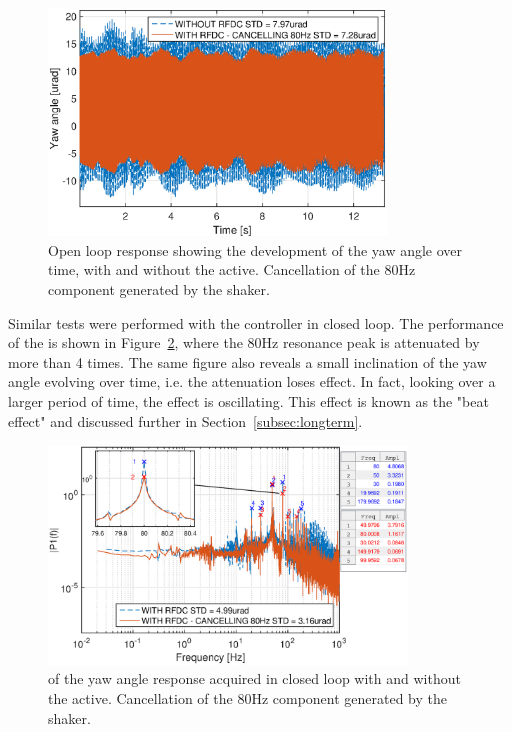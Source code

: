 \begin{figure}[h]
  \centering %
  \includegraphics[width=0.8\textwidth]{fig/matlab/yl_openloop_ext_disturbance_80Hz}
  \caption{\label{fig:yl_openloop_80} Open loop response showing the development of the yaw angle over time, with and without the \abbrRFDC active. Cancellation of the 80Hz component generated by the shaker.}
\end{figure}

Similar tests were performed with the controller in closed loop. The performance of the \abbrRFDC is shown in Figure~\ref{fig:fft_closedloop_80}, where the 80Hz resonance peak is attenuated by more than 4 times. The same figure also reveals a small inclination of the yaw angle evolving over time, i.e. the attenuation loses effect. In fact, looking over a larger period of time, the effect is oscillating. This effect is known as the "beat effect" and discussed further in Section~\ref{subsec:longterm}.

\begin{figure}[h]
  \centering %
  \includegraphics[width=0.85\textwidth]{fig/matlab/fft_closedloop_ext_disturbance_80Hz_with_zoom_2}
  \caption{\label{fig:fft_closedloop_80} \abbrFFT of the yaw angle response acquired in closed loop with and without the \abbrRFDC active. Cancellation of the 80Hz component generated by the shaker.}
\end{figure}

